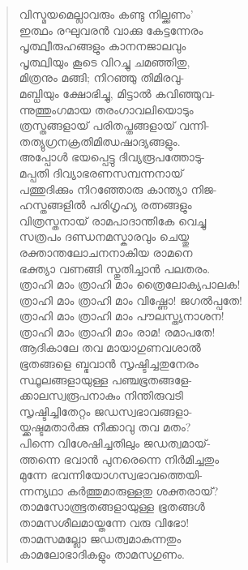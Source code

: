 \begin{verse}
വിസ്മയമെല്ലാവരും കണ്ടു നില്ക്കണം’\\
ഇത്ഥം രഘുവരന്‍ വാക്കു കേട്ടന്നേരം\\
പൃത്ഥ്വീരുഹങ്ങളും കാനനജാലവും\\
പൃത്ഥ്വിയും കൂടെ വിറച്ചു ചമഞ്ഞിതു,\\
മിത്രനും മങ്ങി; നിറഞ്ഞു തിമിരവു-\\
മബ്ധിയും ക്ഷോഭിച്ചു, മിട്ടാല്‍ കവിഞ്ഞുവ-\\
ന്നുത്തുംഗമായ തരംഗാവലിയൊടും\\
ത്രസ്തങ്ങളായ് പരിതപ്തങ്ങളായ് വന്നി-\\
തത്യുഗ്രനക്രതിമിഝഷാദ്യങ്ങളും.\\
അപ്പോള്‍ ഭയപ്പെട്ടു ദിവ്യരൂപത്തോടു-\\
മപ്പതി ദിവ്യാഭരണസമ്പന്നനായ്\\
പത്തുദിക്കും നിറഞ്ഞോരു കാന്ത്യാ നിജ-\\
ഹസ്തങ്ങളില്‍ പരിഗൃഹ്യ രത്നങ്ങളും\\
വിത്രസ്തനായ് രാമപാദാന്തികേ വെച്ചു\\
സത്രപം ദണ്ഡനമസ്കാരവും ചെയ്തു\\
രക്താന്തലോചനനാകിയ രാമനെ\\
ഭക്ത്യാ വണങ്ങി സ്തുതിച്ചാന്‍ പലതരം.\\
ത്രാഹി മാം ത്രാഹി മാം ത്രൈലോക്യപാലക!\\
ത്രാഹി മാം ത്രാഹി മാം വിഷ്ണോ! ജഗല്‍പ്പതേ!\\
ത്രാഹി മാം ത്രാഹി മാം പൗലസ്ത്യനാശന!\\
ത്രാഹി മാം ത്രാഹി മാം രാമ! രമാപതേ!\\
ആദികാലേ തവ മായാഗുണവശാല്‍\\
ഭൂതങ്ങളെ ബ്ഭവാന്‍ സൃഷ്ടിച്ചതുനേരം\\
സ്ഥൂലങ്ങളായുള്ള പഞ്ചഭൂതങ്ങളേ-\\
ക്കാലസ്വരൂപനാകും നിന്തിരുവടി\\
സൃഷ്ടിച്ചിതേറ്റം ജഡസ്വഭാവങ്ങളാ-\\
യ്ക്കഷ്ടമതാര്‍ക്കു നീക്കാവു തവ മതം?\\
പിന്നെ വിശേഷിച്ചതിലും ജഡത്വമായ്-\\
ത്തന്നെ ഭവാന്‍ പുനരെന്നെ നിര്‍മിച്ചതും\\
മുന്നേ ഭവന്നിയോഗസ്വഭാവത്തെയി-\\
ന്നന്യഥാ കര്‍ത്തുമാരുള്ളതു ശക്തരായ്?\\
താമസോത്ഭൂതങ്ങളായുള്ള ഭൂതങ്ങള്‍\\
താമസശീലമായ്തന്നേ വരു വിഭോ!\\
താമസമല്ലോ ജഡത്വമാകുന്നതും\\
കാമലോഭാദികളും താമസഗുണം.\\

\end{verse}
